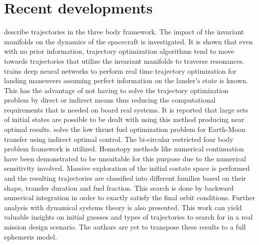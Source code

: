 \section{Recent developments}
\cite{anderson_role_2009} describe trajectories in the three body framework. The impact of the invariant manifolds on the dynamics of the spacecraft is investigated. It is shown that even with no prior information, trajectory optimization algorithms tend to move towards trajectories that utilize the invariant manifolds to traverse resonances. \cite{sanchez-sanchez_real-time_2018} trains deep neural networks to perform real time trajectory optimization for landing maneuvers assuming perfect information on the lander's state is known. This has the advantage of not having to solve the trajectory optimization problem by direct or indirect means thus reducing the computational requirements that is needed on board real systems. It is reported that large sets of initial states are possible to be dealt with using this method producing near optimal results. \cite{perez-palau_fuel_2018} solve the low thrust fuel optimization problem for Earth-Moon transfer using indirect optimal control. The bi-circular restricted four body problem framework is utilized. Homotopy methods like numerical continuation have been demonstrated to be unsuitable for this purpose due to the numerical sensitivity involved. Massive exploration of the initial costate space is performed and the resulting trajectories are classified into different families based on their shape, transfer duration and fuel fraction. This search is done by backward numerical integration in order to exactly satisfy the final orbit conditions. Further analysis with dynamical systems theory is also presented. This work can yield valuable insights on initial guesses and types of trajectories to search for in a real mission design scenario. The authors are yet to transpose these results to a full ephemeris model.

